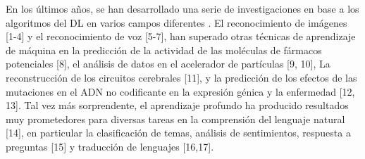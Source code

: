 En los últimos años, se han desarrollado una serie de investigaciones en base a los algoritmos del DL en varios campos diferentes \cite{LeCun2015}. El reconocimiento de imágenes [1-4] y el reconocimiento de voz [5-7], han superado otras técnicas de aprendizaje de máquina en la predicción de la actividad de las moléculas de fármacos potenciales [8], el análisis de datos en el acelerador de partículas [9, 10], La reconstrucción de los circuitos cerebrales [11], y la predicción de los efectos de las mutaciones en el ADN no codificante en la expresión génica y la enfermedad [12, 13]. Tal vez más sorprendente, el aprendizaje profundo ha producido resultados muy prometedores para diversas tareas en la comprensión del lenguaje natural [14], en particular la clasificación de temas, análisis de sentimientos, respuesta a preguntas [15] y traducción de lenguajes [16,17].






